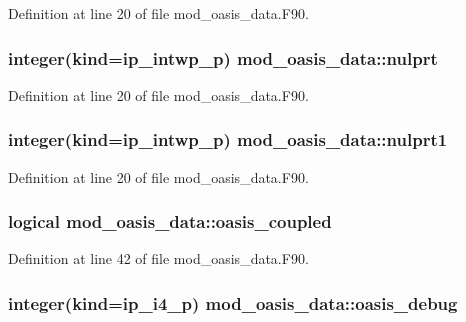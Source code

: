 Definition at line 20 of file mod\+\_\+oasis\+\_\+data.\+F90.

\hypertarget{classmod__oasis__data_af0f17b70f48598dac24f2e41ca0da4b2}{
\subsubsection[{nulprt}]{\setlength{\rightskip}{0pt plus 5cm}integer(kind=ip\+\_\+intwp\+\_\+p) mod\+\_\+oasis\+\_\+data\+::nulprt}}\label{classmod__oasis__data_af0f17b70f48598dac24f2e41ca0da4b2}


Definition at line 20 of file mod\+\_\+oasis\+\_\+data.\+F90.

\hypertarget{classmod__oasis__data_a2b9f5c72f10178df0bda39000b151d24}{
\subsubsection[{nulprt1}]{\setlength{\rightskip}{0pt plus 5cm}integer(kind=ip\+\_\+intwp\+\_\+p) mod\+\_\+oasis\+\_\+data\+::nulprt1}}\label{classmod__oasis__data_a2b9f5c72f10178df0bda39000b151d24}


Definition at line 20 of file mod\+\_\+oasis\+\_\+data.\+F90.

\hypertarget{classmod__oasis__data_a5056590b195dc981725173c79e52de3b}{
\subsubsection[{oasis\+\_\+coupled}]{\setlength{\rightskip}{0pt plus 5cm}logical mod\+\_\+oasis\+\_\+data\+::oasis\+\_\+coupled}}\label{classmod__oasis__data_a5056590b195dc981725173c79e52de3b}


Definition at line 42 of file mod\+\_\+oasis\+\_\+data.\+F90.

\hypertarget{classmod__oasis__data_a51f2f4f66476cf893f2507722cd65958}{
\subsubsection[{oasis\+\_\+debug}]{\setlength{\rightskip}{0pt plus 5cm}integer(kind=ip\+\_\+i4\+\_\+p) mod\+\_\+oasis\+\_\+data\+::oasis\+\_\+debug}}\label{classmod__oasis__data_a51f2f4f66476cf893f2507722cd65958}



